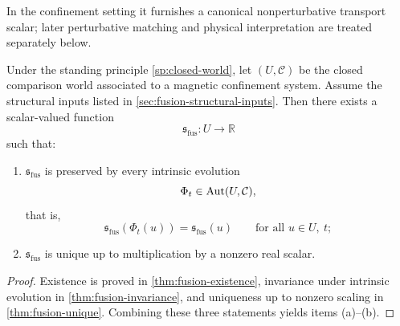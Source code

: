 In the confinement setting it furnishes a canonical nonperturbative
transport scalar; later perturbative matching and physical
interpretation are treated separately below.
\begin{theorem}
	\label{thm:fusion-main-statement}
	Under the standing principle \cref{sp:closed-world}, let
	\((U,\mathcal C)\) be the closed comparison world associated to a
	magnetic confinement system.
	Assume the structural inputs listed in
	\cref{sec:fusion-structural-inputs}.
	Then there exists a scalar-valued function
	\[
		\mathfrak s_{\mathrm{fus}}:U\to\mathbb R
	\]
	such that:
	\begin{enumerate}[label=\textup{(\alph*)}]
		\item
		      \(\mathfrak s_{\mathrm{fus}}\) is preserved by every intrinsic evolution
		      \[
			      \Phi_t\in \operatorname{Aut}(U,\mathcal C),
		      \]
		      that is,
		      \[
			      \mathfrak s_{\mathrm{fus}}(\Phi_t(u))=\mathfrak s_{\mathrm{fus}}(u)
			      \qquad
			      \text{for all }u\in U,\ t;
		      \]
		\item
		      \(\mathfrak s_{\mathrm{fus}}\) is unique up to multiplication by a nonzero real scalar.
	\end{enumerate}
\end{theorem}
\begin{proof}
	Existence is proved in \cref{thm:fusion-existence}, invariance under
	intrinsic evolution in \cref{thm:fusion-invariance}, and uniqueness up
	to nonzero scaling in \cref{thm:fusion-unique}.
	Combining these three statements yields items
	\textup{(a)}--\textup{(b)}.
\end{proof}
